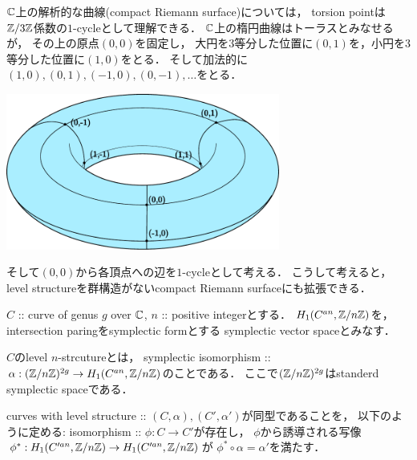\documentclass[a4paper]{jsarticle}
\begin{document}
    $\mathbb{C}$上の解析的な曲線(compact Riemann surface)については，
    torsion pointは$\mathbb{Z}/3\mathbb{Z}$係数の$1$-cycleとして理解できる．
    $\mathbb{C}$上の楕円曲線はトーラスとみなせるが，
    その上の原点$(0,0)$を固定し，
    大円を$3$等分した位置に$(0,1)$を，小円を$3$等分した位置に$(1,0)$をとる．
    そして加法的に$(1,0), (0,1), (-1,0), (0,-1), \dots$をとる．
    \begin{center}
        \includegraphics[width=9cm,pagebox=cropbox]{./images/torus_with_3_torsions.pdf}
    \end{center}
    そして$(0,0)$から各頂点への辺を$1$-cycleとして考える．
    こうして考えると，
    level structureを群構造がないcompact Riemann surfaceにも拡張できる．

    \begin{Def}
        $C$ :: curve of genus $g$ over $\mathbb{C}$, $n$ :: positive integerとする．
        $H_1(C^{an}, \mathbb{Z}/n\mathbb{Z})$を，
        intersection paringをsymplectic formとする
        symplectic vector spaceとみなす．

        $C$のlevel $n$-strcutureとは，
        symplectic isomorphism :: $\alpha: (\mathbb{Z}/n\mathbb{Z})^{2g} \to H_1(C^{an}, \mathbb{Z}/n\mathbb{Z})$のことである．
        ここで$(\mathbb{Z}/n\mathbb{Z})^{2g}$はstanderd symplectic spaceである．

        curves with level structure :: $(C, \alpha), (C', \alpha')$が同型であることを，
        以下のように定める:
        isomorphism :: $\phi: C \to C'$が存在し，
        $\phi$から誘導される写像$\phi^*: H_1(C'^{an}, \mathbb{Z}/n\mathbb{Z}) \to H_1(C'^{an}, \mathbb{Z}/n\mathbb{Z})$が
        $\phi^* \circ \alpha=\alpha'$を満たす．
    \end{Def}
\end{document}
